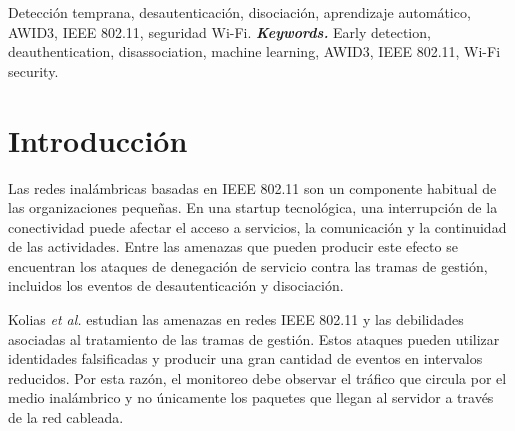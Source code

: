 \documentclass[journal]{IEEEtran}
\begin{document}
\begin{abstract}
\vspace{1em}
\noindent \textbf{\textit{Abstract.}} This paper presents the design and a proof of concept for early detection of deauthentication and disassociation attacks in a reference Wi-Fi network for a small business with 5 to 10 users. The proposed architecture is based on IEEE 802.11ac and includes an access point, VLAN segmentation, a wireless monitor-mode sensor, and an analysis server. The proof of concept was evaluated with the AWID3 dataset through a Python workflow, using a leave-one-attack-out partition between the two attack types. A threshold-based baseline was compared with a Random Forest model over temporal windows of management frames. On the test set, both models obtained an F1 between 0.997 and 1.000; the observed data-time latencies were 0.26 s and 1.48 s, distinct from processing time, which in an offline replay was a few milliseconds per window. The Random Forest did not outperform the baseline. Mitigation is run as a controlled simulation that only writes records, without actions against real networks. The results depend on AWID3, whose environment differs from the reference scenario, and on a single attack episode per direction.
\end{abstract}

\begin{IEEEkeywords}
Detección temprana, desautenticación, disociación, aprendizaje automático, AWID3, IEEE 802.11, seguridad Wi-Fi. \textbf{\textit{Keywords.}} Early detection, deauthentication, disassociation, machine learning, AWID3, IEEE 802.11, Wi-Fi security.
\end{IEEEkeywords}

\section{Introducción}

Las redes inalámbricas basadas en IEEE 802.11 son un componente habitual de las organizaciones pequeñas. En una startup tecnológica, una interrupción de la conectividad puede afectar el acceso a servicios, la comunicación y la continuidad de las actividades. Entre las amenazas que pueden producir este efecto se encuentran los ataques de denegación de servicio contra las tramas de gestión, incluidos los eventos de desautenticación y disociación.

Kolias \textit{et al.} \cite{kolias2016} estudian las amenazas en redes IEEE 802.11 y las debilidades asociadas al tratamiento de las tramas de gestión. Estos ataques pueden utilizar identidades falsificadas y producir una gran cantidad de eventos en intervalos reducidos. Por esta razón, el monitoreo debe observar el tráfico que circula por el medio inalámbrico y no únicamente los paquetes que llegan al servidor a través de la red cableada.
\end{document}
